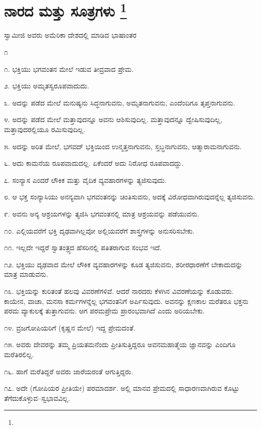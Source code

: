 
\chapter[ನಾರದ ಮತ್ತು ಸೂತ್ರಗಳು ]{ನಾರದ ಮತ್ತು ಸೂತ್ರಗಳು \protect\footnote{}}

\centerline{ಸ್ವಾಮೀಜಿ ಅವರು ಅಮೆರಿಕಾ ದೇಶದಲ್ಲಿ ಮಾಡಿದ ಭಾಷಾಂತರ}

\begin{center}
೧
\end{center}

೧. ಭಕ್ತಿಯು ಭಗವಂತನ ಮೇಲೆ ಇಡುವ ತೀವ್ರವಾದ ಪ್ರೇಮ.

೨. ಭಕ್ತಿಯು ಅಮೃತಸ್ವರೂಪವಾದುದು.

೩. ಅದನ್ನು ಪಡೆದ ಮೇಲೆ ಮನುಷ್ಯನು ಸಿದ್ಧನಾಗುವನು, ಅಮೃತನಾಗುವನು, ಎಂದೆಂದಿಗೂ ತೃಪ್ತನಾಗುವನು.

೪. ಅದನ್ನು ಪಡೆದ ಮೇಲೆ ಮತ್ತಾವುದನ್ನೂ ಅವನು ಆಶಿಸುವುದಿಲ್ಲ. ಮತ್ತಾವುದನ್ನೂ ದ್ವೇಷಿಸುವುದಿಲ್ಲ, ಮತ್ತಾವುದರಲ್ಲಿಯೂ ರಮಿಸುವುದಿಲ್ಲ.

೫. ಅದನ್ನು ಅರಿತ ಮೇಲೆ, ಭಗವದ್​ ಭಕ್ತಿಯಿಂದ ಉನ್ಮತ್ತನಾಗುವನು, ಸ್ತಬ್ಧನಾಗುವನು, ಆತ್ಮಾರಾಮನಾಗುವನು.

೬. ಅದು ಕಾಮನೆಯ ರೂಪವಾದುದಲ್ಲ. ಏಕೆಂದರೆ ಅದು ನಿರೋಧ ರೂಪವಾದದ್ದು.

೭. ಸಂನ್ಯಾಸ ಎಂದರೆ ಲೌಕಿಕ ಮತ್ತು ವೈದಿಕ ವ್ಯವಹಾರಗಳನ್ನು ತ್ಯಜಿಸುವುದು.

೮. ಆ ಭಕ್ತ ಸಂನ್ಯಾಸಿಯು ಅನನ್ಯವಾಗಿ ಭಗವಂತನನ್ನು ಚಿಂತಿಸುವನು, ಅದಕ್ಕೆ ವಿರೋಧವಾಗಿರುವುದನ್ನೆಲ್ಲ ತ್ಯಜಿಸುವನು.

೯. ಅವನು ಅನ್ಯ ಆಶ್ರಯಗಳನ್ನು ತ್ಯಜಿಸಿ ಭಗವಂತನಲ್ಲಿ ಮಾತ್ರ ಆಶ್ರಯವನ್ನು ಪಡೆಯುವನು.

೧೦. ಎಲ್ಲಿಯವರೆಗೆ ಭಕ್ತಿ ದೃಢವಾಗಿಲ್ಲವೋ ಅಲ್ಲಿಯವರೆಗೆ ಶಾಸ್ತ್ರಗಳನ್ನು ಅನುಸರಿಸಬೇಕು.

೧೧. ಇಲ್ಲದೇ ಇದ್ದರೆ ಸ್ವಾತಂತ್ರ್ಯದ ಹೆಸರಿನಲ್ಲಿ ಪತಿತರಾಗುವ ಸಂಭವ ಇದೆ.

೧೨. ಭಕ್ತಿಯು ದೃಢವಾದ ಮೇಲೆ ಲೌಕಿಕ ವ್ಯವಹಾರಗಳನ್ನು ಕೂಡ ತ್ಯಜಿಸುವನು, ಶರೀರಧಾರಣೆಗೆ ಬೇಕಾದುದನ್ನು ಮಾತ್ರ ಮಾಡುವನು.

೧೩. ಭಕ್ತಿಯನ್ನು ಕುರಿತಂತೆ ಹಲವು ವಿವರಣೆಗಳಿವೆ. ಆದರೆ ನಾರದರು ಕೆಳಗಿನ ವಿವರಣೆಯನ್ನು ಕೊಡುವರು. ಕಾಯೇನ, ವಾಚಾ, ಮನಸಾ ಕರ್ಮಗಳನ್ನೆಲ್ಲ ಭಗವಂತನಿಗೆ ಅರ್ಪಿಸುವುದು. ಅವನನ್ನು ಕ್ಷಣಕಾಲ ಮರೆತರೂ ಭಕ್ತನು ಪರಮ ವ್ಯಾಕುಲಕ್ಕೆ ತುತ್ತಾಗುವನು. ಆಗ ಪರಮಪ್ರೇಮ ಪ್ರಾರಂಭವಾಗಿದೆ ಎಂದು ಅರಿಯಬೇಕು.

೧೪. ವ್ರಜಗೋಪಿಯರಿಗೆ (ಕೃಷ್ಣನ ಮೇಲೆ) ಇದ್ದ ಪ್ರೇಮದಂತೆ.

೧೫. ಅವರು ದೇವರನ್ನು ತಮ್ಮ ಪ್ರಿಯತಮನೆಂದು ಪ್ರೀತಿಸುತ್ತಿದ್ದರೂ ಅವನ\break ಮಹಾತ್ಮೆಯ ಜ್ಞಾನವನ್ನು ಎಂದಿಗೂ ಮರೆತಿರಲಿಲ್ಲ.

೧೬. ಹಾಗೆ ಮರೆತಿದ್ದರೆ ಅವರು ಜಾರೆಯರಂತೆ ಆಗುತ್ತಿದ್ದರು.

೧೭. ಅದೇ (ಗೋಪಿಯರ ಪ್ರೀತಿಯೇ) ಪರಮಾದರ್ಶ. ಅಲ್ಲಿ ಮಾನವ ಪ್ರೇಮದಲ್ಲಿ ಸಾಧಾರಣವಾಗಿರುವ ಕೊಟ್ಟು ತೆಗೆದುಕೊಳ್ಳುವ–ಸ್ವಭಾವವಿಲ್ಲ.

